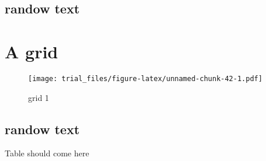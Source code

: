 \documentclass[]{article}
\begin{document}
\subsection{randow text}\label{randow-text-23}

\lipsum

\section{A grid}\label{a-grid-11}

\begin{figure}[htbp]
\centering
\texttt{[image: trial\_files/figure-latex/unnamed-chunk-42-1.pdf]}
\caption{grid 1}
\end{figure}

\subsection{randow text}\label{randow-text-24}

\lipsum

Table should come here
\end{document}
